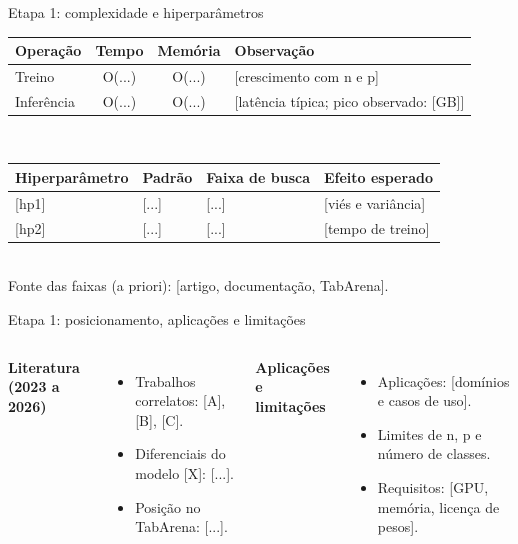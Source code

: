 \documentclass[aspectratio=169,11pt]{beamer}
\begin{document}
\begin{frame}{Etapa 1: complexidade e hiperparâmetros}
    \footnotesize
    \begin{tabular}{l c c p{5.2cm}}
        \toprule
        \textbf{Operação} & \textbf{Tempo} & \textbf{Memória} & \textbf{Observação} \\
        \midrule
        Treino     & O(...) & O(...) & [crescimento com n e p] \\
        Inferência & O(...) & O(...) & [latência típica; pico observado: [GB]] \\
        \bottomrule
    \end{tabular}
    \\[0.6em]
    \begin{tabular}{l p{2.2cm} p{3.4cm} p{4.0cm}}
        \toprule
        \textbf{Hiperparâmetro} & \textbf{Padrão} & \textbf{Faixa de busca} & \textbf{Efeito esperado} \\
        \midrule
        {}[hp1] & [...] & [...] & [viés e variância] \\
        {}[hp2] & [...] & [...] & [tempo de treino] \\
        \bottomrule
    \end{tabular}
    \\[0.4em]
    Fonte das faixas (a priori): [artigo, documentação, TabArena].
\end{frame}

\begin{frame}{Etapa 1: posicionamento, aplicações e limitações}
    \begin{columns}[T,onlytextwidth]
        \textbf{Literatura (2023 a 2026)}
        \footnotesize
        \begin{itemize}
            \item Trabalhos correlatos: [A], [B], [C].
            \item Diferenciais do modelo [X]: [...].
            \item Posição no TabArena: [...].
        \end{itemize}
        \textbf{Aplicações e limitações}
        \footnotesize
        \begin{itemize}
            \item Aplicações: [domínios e casos de uso].
            \item Limites de n, p e número de classes.
            \item Requisitos: [GPU, memória, licença de pesos].
        \end{itemize}
    \end{columns}
\end{frame}
\end{document}
